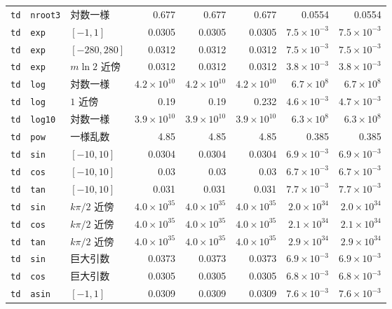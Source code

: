 \documentclass[a4paper,10pt]{ltjsarticle}
\begin{document}
\begin{longtable}{lll rrr rr}
\texttt{td} & \texttt{nroot3} & 対数一様 & 0.677 & 0.677 & 0.677 & 0.0554 & 0.0554 \\
\texttt{td} & \texttt{exp} & $[-1,1]$ & 0.0305 & 0.0305 & 0.0305 & $7.5\times10^{-3}$ & $7.5\times10^{-3}$ \\
\texttt{td} & \texttt{exp} & $[-280,280]$ & 0.0312 & 0.0312 & 0.0312 & $7.5\times10^{-3}$ & $7.5\times10^{-3}$ \\
\texttt{td} & \texttt{exp} & $m\ln 2$ 近傍 & 0.0312 & 0.0312 & 0.0312 & $3.8\times10^{-3}$ & $3.8\times10^{-3}$ \\
\texttt{td} & \texttt{log} & 対数一様 & $4.2\times10^{10}$ & $4.2\times10^{10}$ & $4.2\times10^{10}$ & $6.7\times10^{8}$ & $6.7\times10^{8}$ \\
\texttt{td} & \texttt{log} & $1$ 近傍 & 0.19 & 0.19 & 0.232 & $4.6\times10^{-3}$ & $4.7\times10^{-3}$ \\
\texttt{td} & \texttt{log10} & 対数一様 & $3.9\times10^{10}$ & $3.9\times10^{10}$ & $3.9\times10^{10}$ & $6.3\times10^{8}$ & $6.3\times10^{8}$ \\
\texttt{td} & \texttt{pow} & 一様乱数 & 4.85 & 4.85 & 4.85 & 0.385 & 0.385 \\
\texttt{td} & \texttt{sin} & $[-10,10]$ & 0.0304 & 0.0304 & 0.0304 & $6.9\times10^{-3}$ & $6.9\times10^{-3}$ \\
\texttt{td} & \texttt{cos} & $[-10,10]$ & 0.03 & 0.03 & 0.03 & $6.7\times10^{-3}$ & $6.7\times10^{-3}$ \\
\texttt{td} & \texttt{tan} & $[-10,10]$ & 0.031 & 0.031 & 0.031 & $7.7\times10^{-3}$ & $7.7\times10^{-3}$ \\
\texttt{td} & \texttt{sin} & $k\pi/2$ 近傍 & $4.0\times10^{35}$ & $4.0\times10^{35}$ & $4.0\times10^{35}$ & $2.0\times10^{34}$ & $2.0\times10^{34}$ \\
\texttt{td} & \texttt{cos} & $k\pi/2$ 近傍 & $4.0\times10^{35}$ & $4.0\times10^{35}$ & $4.0\times10^{35}$ & $2.1\times10^{34}$ & $2.1\times10^{34}$ \\
\texttt{td} & \texttt{tan} & $k\pi/2$ 近傍 & $4.0\times10^{35}$ & $4.0\times10^{35}$ & $4.0\times10^{35}$ & $2.9\times10^{34}$ & $2.9\times10^{34}$ \\
\texttt{td} & \texttt{sin} & 巨大引数 & 0.0373 & 0.0373 & 0.0373 & $6.9\times10^{-3}$ & $6.9\times10^{-3}$ \\
\texttt{td} & \texttt{cos} & 巨大引数 & 0.0305 & 0.0305 & 0.0305 & $6.8\times10^{-3}$ & $6.8\times10^{-3}$ \\
\texttt{td} & \texttt{asin} & $[-1,1]$ & 0.0309 & 0.0309 & 0.0309 & $7.6\times10^{-3}$ & $7.6\times10^{-3}$ \\

\end{longtable}
\end{document}
